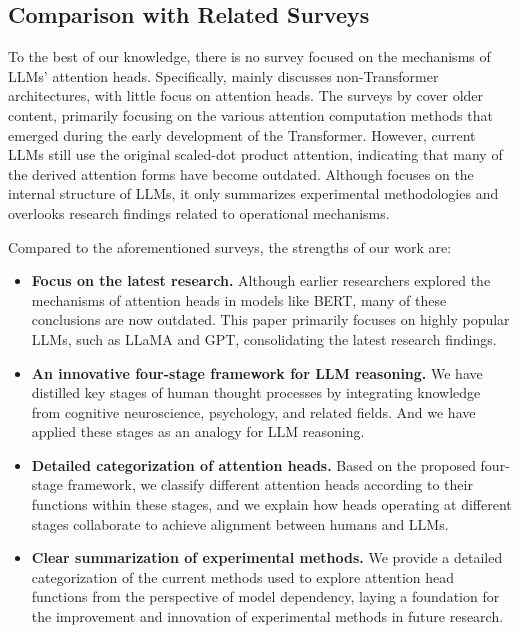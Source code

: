 \documentclass{article}
\begin{document}
\subsection{Comparison with Related Surveys}
To the best of our knowledge, there is no survey focused on the mechanisms of LLMs' attention heads. Specifically, \citet{SurveyDNNInner_23_SaTML_MIT} mainly discusses non-Transformer architectures, with little focus on attention heads. The surveys by \citet{SurveyMdedical_22_IEEE_Portugal, SurveyNeurAttn_21_arXiv_Brazil, SurveyAttentionModel_21_Linkedin, SurveydDLAttn_22_arixv_Netherland} cover older content, primarily focusing on the various attention computation methods that emerged during the early development of the Transformer. However, current LLMs still use the original scaled-dot product attention, indicating that many of the derived attention forms have become outdated. Although \citep{SurveyLLMInterp_24_arXiv} focuses on the internal structure of LLMs, it only summarizes experimental methodologies and overlooks research findings related to operational mechanisms.

Compared to the aforementioned surveys, the strengths of our work are:
\begin{itemize}
    \item \textbf{Focus on the latest research.} Although earlier researchers explored the mechanisms of attention heads in models like BERT, many of these conclusions are now outdated. This paper primarily focuses on highly popular LLMs, such as LLaMA and GPT, consolidating the latest research findings.
    \item \textbf{An innovative four-stage framework for LLM reasoning.} We have distilled key stages of human thought processes by integrating knowledge from cognitive neuroscience, psychology, and related fields. And we have applied these stages as an analogy for LLM reasoning.
    \item \textbf{Detailed categorization of attention heads.} Based on the proposed four-stage framework, we classify different attention heads according to their functions within these stages, and we explain how heads operating at different stages collaborate to achieve alignment between humans and LLMs.
    \item \textbf{Clear summarization of experimental methods.} We provide a detailed categorization of the current methods used to explore attention head functions from the perspective of model dependency, laying a foundation for the improvement and innovation of experimental methods in future research.
\end{itemize}
\end{document}
